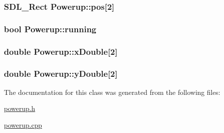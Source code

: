 \subsubsection[{pos}]{\setlength{\rightskip}{0pt plus 5cm}S\+D\+L\+\_\+\+Rect Powerup\+::pos\mbox{[}2\mbox{]}}\label{classPowerup_a2a54f29f4d6dda924142d2e25ed708f3}
\hypertarget{classPowerup_a8e8bb44d2f49ffa3b1597659a347b152}{}
\subsubsection[{running}]{\setlength{\rightskip}{0pt plus 5cm}bool Powerup\+::running}\label{classPowerup_a8e8bb44d2f49ffa3b1597659a347b152}
\hypertarget{classPowerup_a2fc3cbe71c54a30e783d0a4bf0a0621e}{}
\subsubsection[{x\+Double}]{\setlength{\rightskip}{0pt plus 5cm}double Powerup\+::x\+Double\mbox{[}2\mbox{]}}\label{classPowerup_a2fc3cbe71c54a30e783d0a4bf0a0621e}
\hypertarget{classPowerup_a744b567364acc03b432218fcfdc9d969}{}
\subsubsection[{y\+Double}]{\setlength{\rightskip}{0pt plus 5cm}double Powerup\+::y\+Double\mbox{[}2\mbox{]}}\label{classPowerup_a744b567364acc03b432218fcfdc9d969}


The documentation for this class was generated from the following files\+:\begin{DoxyCompactItemize}
\item 
\hyperlink{powerup_8h}{powerup.\+h}\item 
\hyperlink{powerup_8cpp}{powerup.\+cpp}\end{DoxyCompactItemize}
